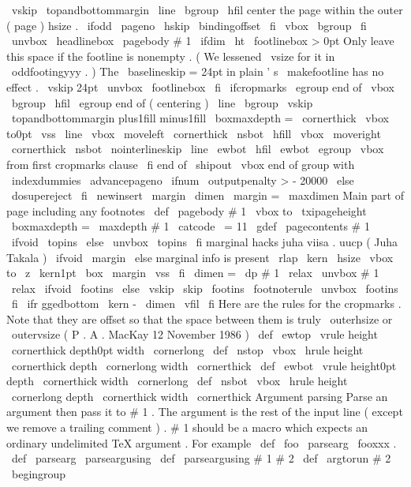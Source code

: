 {{{{\
vskip
\
topandbottommargin
\
line
\
bgroup
\
hfil
%
center
the
page
within
the
outer
(
page
)
hsize
.
\
ifodd
\
pageno
\
hskip
\
bindingoffset
\
fi
\
vbox
\
bgroup
\
fi
%
\
unvbox
\
headlinebox
\
pagebody
{
#
1
}
%
\
ifdim
\
ht
\
footlinebox
>
0pt
%
Only
leave
this
space
if
the
footline
is
nonempty
.
%
(
We
lessened
\
vsize
for
it
in
\
oddfootingyyy
.
)
%
The
\
baselineskip
=
24pt
in
plain
'
s
\
makefootline
has
no
effect
.
\
vskip
24pt
\
unvbox
\
footlinebox
\
fi
%
\
ifcropmarks
\
egroup
%
end
of
\
vbox
\
bgroup
\
hfil
\
egroup
%
end
of
(
centering
)
\
line
\
bgroup
\
vskip
\
topandbottommargin
plus1fill
minus1fill
\
boxmaxdepth
=
\
cornerthick
\
vbox
to0pt
{
\
vss
\
line
{
%
\
vbox
{
\
moveleft
\
cornerthick
\
nsbot
}
%
\
hfill
\
vbox
{
\
moveright
\
cornerthick
\
nsbot
}
%
}
%
\
nointerlineskip
\
line
{
\
ewbot
\
hfil
\
ewbot
}
%
}
%
\
egroup
%
\
vbox
from
first
cropmarks
clause
\
fi
}
%
end
of
\
shipout
\
vbox
}
%
end
of
group
with
\
indexdummies
\
advancepageno
\
ifnum
\
outputpenalty
>
-
20000
\
else
\
dosupereject
\
fi
}
\
newinsert
\
margin
\
dimen
\
margin
=
\
maxdimen
%
Main
part
of
page
including
any
footnotes
\
def
\
pagebody
#
1
{
\
vbox
to
\
txipageheight
{
\
boxmaxdepth
=
\
maxdepth
#
1
}
}
{
\
catcode
\
=
11
\
gdef
\
pagecontents
#
1
{
\
ifvoid
\
topins
\
else
\
unvbox
\
topins
\
fi
%
marginal
hacks
juha
viisa
.
uucp
(
Juha
Takala
)
\
ifvoid
\
margin
\
else
%
marginal
info
is
present
\
rlap
{
\
kern
\
hsize
\
vbox
to
\
z
{
\
kern1pt
\
box
\
margin
\
vss
}
}
\
fi
\
dimen
=
\
dp
#
1
\
relax
\
unvbox
#
1
\
relax
\
ifvoid
\
footins
\
else
\
vskip
\
skip
\
footins
\
footnoterule
\
unvbox
\
footins
\
fi
\
ifr
ggedbottom
\
kern
-
\
dimen
\
vfil
\
fi
}
}
%
Here
are
the
rules
for
the
cropmarks
.
Note
that
they
are
%
offset
so
that
the
space
between
them
is
truly
\
outerhsize
or
\
outervsize
%
(
P
.
A
.
MacKay
12
November
1986
)
%
\
def
\
ewtop
{
\
vrule
height
\
cornerthick
depth0pt
width
\
cornerlong
}
\
def
\
nstop
{
\
vbox
{
\
hrule
height
\
cornerthick
depth
\
cornerlong
width
\
cornerthick
}
}
\
def
\
ewbot
{
\
vrule
height0pt
depth
\
cornerthick
width
\
cornerlong
}
\
def
\
nsbot
{
\
vbox
{
\
hrule
height
\
cornerlong
depth
\
cornerthick
width
\
cornerthick
}
}
%
Argument
parsing
%
Parse
an
argument
then
pass
it
to
#
1
.
The
argument
is
the
rest
of
%
the
input
line
(
except
we
remove
a
trailing
comment
)
.
#
1
should
be
a
%
macro
which
expects
an
ordinary
undelimited
TeX
argument
.
%
For
example
\
def
\
foo
{
\
parsearg
\
fooxxx
}
.
%
\
def
\
parsearg
{
\
parseargusing
{
}
}
\
def
\
parseargusing
#
1
#
2
{
%
\
def
\
argtorun
{
#
2
}
%
\
begingroup
}}
